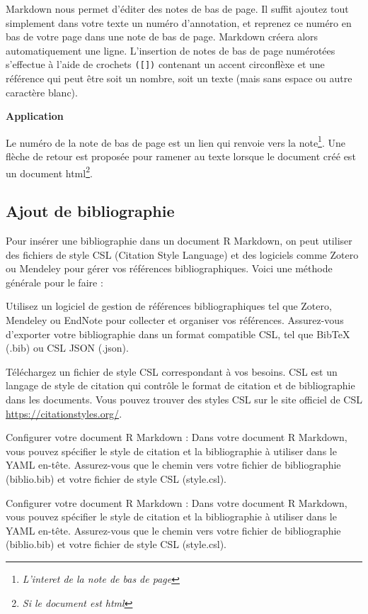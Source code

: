 \documentclass[
  12pt,
]{article}
\begin{document}
Markdown nous permet d'éditer des notes de bas de page. Il suffit
ajoutez tout simplement dans votre texte un numéro d'annotation, et
reprenez ce numéro en bas de votre page dans une note de bas de page.
Markdown créera alors automatiquement une ligne. L'insertion de notes de
bas de page numérotées s'effectue à l'aide de crochets \texttt{({[}{]})}
contenant un accent circonflèxe et une référence qui peut être soit un
nombre, soit un texte (mais sans espace ou autre caractère blanc).

\textbf{Application}

Le numéro de la note de bas de page est un lien qui renvoie vers la
note\footnote{\emph{L'interet de la note de bas de page}}. Une flèche de
retour est proposée pour ramener au texte lorsque le document créé est
un document html\footnote{\emph{Si le document est html}}.

\subsection{Ajout de bibliographie}\label{ajout-de-bibliographie}

Pour insérer une bibliographie dans un document R Markdown, on peut
utiliser des fichiers de style CSL (Citation Style Language) et des
logiciels comme Zotero ou Mendeley pour gérer vos références
bibliographiques. Voici une méthode générale pour le faire :

Utilisez un logiciel de gestion de références bibliographiques tel que
Zotero, Mendeley ou EndNote pour collecter et organiser vos références.
Assurez-vous d'exporter votre bibliographie dans un format compatible
CSL, tel que BibTeX (.bib) ou CSL JSON (.json).

Téléchargez un fichier de style CSL correspondant à vos besoins. CSL est
un langage de style de citation qui contrôle le format de citation et de
bibliographie dans les documents. Vous pouvez trouver des styles CSL sur
le site officiel de CSL \url{https://citationstyles.org/}.

Configurer votre document R Markdown : Dans votre document R Markdown,
vous pouvez spécifier le style de citation et la bibliographie à
utiliser dans le YAML en-tête. Assurez-vous que le chemin vers votre
fichier de bibliographie (biblio.bib) et votre fichier de style CSL
(style.csl).

Configurer votre document R Markdown : Dans votre document R Markdown,
vous pouvez spécifier le style de citation et la bibliographie à
utiliser dans le YAML en-tête. Assurez-vous que le chemin vers votre
fichier de bibliographie (biblio.bib) et votre fichier de style CSL
(style.csl).
\end{document}
